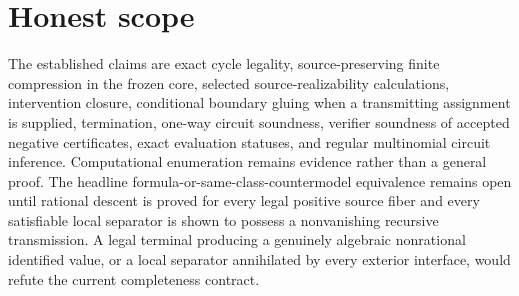 \documentclass{article}
\begin{document}
\section{Honest scope}

The established claims are exact cycle legality, source-preserving finite compression in the frozen core, selected source-realizability calculations, intervention closure, conditional boundary gluing when a transmitting assignment is supplied, termination, one-way circuit soundness, verifier soundness of accepted negative certificates, exact evaluation statuses, and regular multinomial circuit inference.  Computational enumeration remains evidence rather than a general proof.  The headline formula-or-same-class-countermodel equivalence remains open until rational descent is proved for every legal positive source fiber and every satisfiable local separator is shown to possess a nonvanishing recursive transmission.  A legal terminal producing a genuinely algebraic nonrational identified value, or a local separator annihilated by every exterior interface, would refute the current completeness contract.
\end{document}

